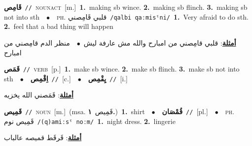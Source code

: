 \documentclass[10pt,a4paper,twoside]{article} %
\begin{document}
\begin{multicols}{2}
{\setlength\topsep{0pt}\textbf{\foreignlanguage{arabic}{قَامِص}}\ {\color{gray}\texttt{//}\color{black}}\ \textsc{noun\textunderscore act}\ [m.]\ \textbf{1.}~making sb wince.  \textbf{2.}~making sb flinch.  \textbf{3.}~making sb not into sth\ \ $\bullet$\ \ \textsc{ph.} \color{gray} \foreignlanguage{arabic}{قلبي قَامِصني}\color{black}\ {\color{gray}\texttt{/{\sffamily qalbi qaːmisˤni}/}\color{black}}\ \textbf{1.}~Very afraid to do sth.  \textbf{2.}~feel that a bad thing will happen\  \begin{flushright}\color{gray}\foreignlanguage{arabic}{\textbf{\underline{\foreignlanguage{arabic}{أمثلة}}}: قلبي قامِصني من امبارح والله مش عارفة ليش\ $\bullet$\ \  منظر الدم قامِصني من امبارح}\end{flushright}\color{black}} \vspace{2mm}

{\setlength\topsep{0pt}\textbf{\foreignlanguage{arabic}{قَمَص}}\ {\color{gray}\texttt{//}\color{black}}\ \textsc{verb}\ [p.]\ \textbf{1.}~make sb wince.  \textbf{2.}~make sb flinch.  \textbf{3.}~make sb not into sth\ \ $\bullet$\ \ \setlength\topsep{0pt}\textbf{\foreignlanguage{arabic}{اِقْمِص}}\ {\color{gray}\texttt{//}\color{black}}\ [c.]\ \ $\bullet$\ \ \setlength\topsep{0pt}\textbf{\foreignlanguage{arabic}{يِقْمِص}}\ {\color{gray}\texttt{//}\color{black}}\ [i.]\  \begin{flushright}\color{gray}\foreignlanguage{arabic}{\textbf{\underline{\foreignlanguage{arabic}{أمثلة}}}: قَمَصني الله يخزيه}\end{flushright}\color{black}} \vspace{2mm}

{\setlength\topsep{0pt}\textbf{\foreignlanguage{arabic}{قَمِيص}}\ {\color{gray}\texttt{//}\color{black}}\ \textsc{noun}\ [m.]\ \color{gray}(msa. \foreignlanguage{arabic}{قَمِيص}~\foreignlanguage{arabic}{\textbf{١.}})\color{black}\ \textbf{1.}~shirt\ \ $\bullet$\ \ \setlength\topsep{0pt}\textbf{\foreignlanguage{arabic}{قُمْصَان}}\ {\color{gray}\texttt{//}\color{black}}\ [pl.]\ \ $\bullet$\ \ \textsc{ph.} \color{gray} \foreignlanguage{arabic}{قَمِيص نوم}\color{black}\ {\color{gray}\texttt{/{\sffamily (q)amiːsˤ noːm}/}\color{black}}\ \textbf{1.}~night dress.  \textbf{2.}~lingerie\  \begin{flushright}\color{gray}\foreignlanguage{arabic}{\textbf{\underline{\foreignlanguage{arabic}{أمثلة}}}: قَرقَط قميصه عالباب}\end{flushright}\color{black}} \vspace{2mm}


\end{multicols}
\end{document}

